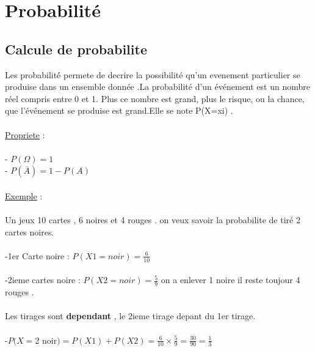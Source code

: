 \documentclass[a4paper,8pt,openany]{book}
\begin{document}

\chapter{Probabilit\'e}

\section{Calcule de probabilite}
Les probabilit\'é permete de decrire la possibilit\'e qu'un evenement particulier se produise dans un ensemble 
donn\'ee .La probabilité d'un événement est un nombre réel compris entre 0 et 1. Plus ce nombre est grand, plus le risque, ou la chance, que l'événement se produise est grand.Elle se note P(X=xi) \Rightarrow {}.\\
\\
\underline{Propriete} : \\
\\
- $P(\Omega)=1$\\
- $P(\overline{A})=1-P(A)$\\
\\
\underline{Exemple} :\\
\\
Un jeux 10 cartes , 6 noires et 4 rouges . on veux savoir la probabilite de tir\'e 2 cartes noires.\\
\\
-1er Carte noire : $P(X1= noir) = \frac{6}{10}$ \\
\\
-2ieme cartes noire : $P(X2= noir)= \frac{5}{9}$ on a enlever 1 noire il reste toujour 4 rouges .\\
\\
Les tirages sont \textbf{dependant} , le 2ieme tirage depant du 1er tirage.\\
\\
-$P(X = $2 noir$)=P(X1)+P(X2) =\frac{6}{10}\times \frac{5}{9}=\frac{30}{90}=\frac{1}{3}$\\
\\
\end{document}

